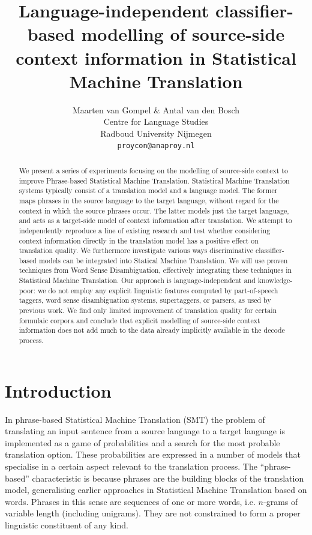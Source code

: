 \documentclass[smallextended]{svjour3}       %
\title{Language-independent classifier-based modelling of source-side context information in Statistical Machine Translation}
\author{Maarten van Gompel \& Antal van den Bosch \\
  Centre for Language Studies \\
  Radboud University Nijmegen \\
  {\tt proycon@anaproy.nl}}
\theoremstyle{break}
\begin{document}
\maketitle

\begin{abstract} 
  We present a series of experiments focusing on the modelling of
  source-side context to improve Phrase-based Statistical Machine
  Translation. Statistical Machine Translation systems typically
  consist of a translation model and a language model. The former maps
  phrases in the source language to the target language, without
  regard for the context in which the source phrases occur. The latter
  models just the target language, and acts as a target-side model of
  context information after translation. We attempt to independently
  reproduce a line of existing research and test whether considering
  context information directly in the translation model has a positive
  effect on translation quality.  We furthermore investigate various
  ways discriminative classifier-based models can be integrated into
  Statical Machine Translation.  We will use proven techniques from
  Word Sense Disambiguation, effectively integrating these techniques in
  Statistical Machine Translation. Our approach is
  language-independent and knowledge-poor: we do not employ any
  explicit linguistic features computed by part-of-speech taggers,
  word sense disambiguation systems, supertaggers, or parsers, as used
  by previous work. We find only limited improvement of translation quality for
  certain formulaic corpora and conclude that explicit modelling of source-side
  context information does not add much to the data already implicitly
  available in the decode process.
\end{abstract}

\section{Introduction}

In phrase-based Statistical Machine Translation (SMT) the problem of
translating an input sentence from a source language to a target language is
implemented as a game of probabilities and a search for the most probable
translation option.  These probabilities are expressed in a number of models
that specialise in a certain aspect relevant to the translation process. The
``phrase-based'' characteristic is because phrases are the building blocks of
the translation model, generalising earlier approaches in
Statistical Machine Translation based on words.  Phrases in this
sense are sequences of one or more words, i.e. $n$-grams of variable
length (including unigrams). They are not constrained to form a
proper linguistic constituent of any kind.
\end{document}
